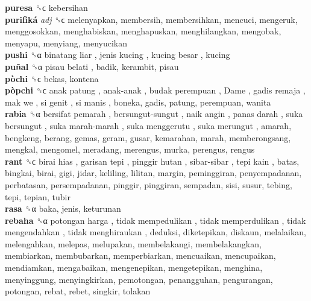 \textbf{puresa} ␝ϲ  kebersihan  \\
\textbf{purifiká} \emph{adj}  ␝ϲ  melenyapkan, membersih, membersihkan, mencuci, mengeruk, menggosokkan, menghabiskan, menghapuskan, menghilangkan, mengobak, menyapu, menyiang, menyucikan  \\
\textbf{pushi} ␝α   binatang liar ,  jenis kucing ,  kucing besar , kucing  \\
\textbf{puñal} ␝α   pisau belati , badik, kerambit, pisau  \\
\textbf{pòchi} ␝ϲ  bekas, kontena  \\
\textbf{pòpchi} ␝ϲ   anak patung ,  anak-anak ,  budak perempuan ,  Dame ,  gadis remaja ,  mak we ,  si genit ,  si manis , boneka, gadis, patung, perempuan, wanita  \\
\textbf{rabia} ␝α   bersifat pemarah ,  bersungut-sungut ,  naik angin ,  panas darah ,  suka bersungut ,  suka marah-marah ,  suka menggerutu ,  suka merungut , amarah, bengkeng, berang, gemas, geram, gusar, kemarahan, marah, memberongsang, mengkal, mengomel, meradang, merengus, murka, perengus, rengus  \\
\textbf{rant} ␝ϲ   birai hias ,  garisan tepi ,  pinggir hutan ,  sibar-sibar ,  tepi kain , batas, bingkai, birai, gigi, jidar, keliling, lilitan, margin, peminggiran, penyempadanan, perbatasan, persempadanan, pinggir, pinggiran, sempadan, sisi, susur, tebing, tepi, tepian, tubir  \\
\textbf{rasa} ␝α  baka, jenis, keturunan  \\
\textbf{rebaha} ␝α   potongan harga ,  tidak mempedulikan ,  tidak memperdulikan ,  tidak mengendahkan ,  tidak menghiraukan , deduksi, diketepikan, diskaun, melalaikan, melengahkan, melepas, melupakan, membelakangi, membelakangkan, membiarkan, membubarkan, memperbiarkan, mencuaikan, mencupaikan, mendiamkan, mengabaikan, mengenepikan, mengetepikan, menghina, menyinggung, menyingkirkan, pemotongan, penangguhan, pengurangan, potongan, rebat, rebet, singkir, tolakan  \\
